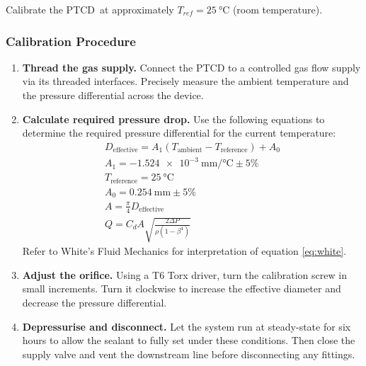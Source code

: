 \documentclass[12pt, letterpaper]{report}%
\newcounter{mycounter}           %
\newcounter{sub}[mycounter]      %
\newcommand{\device}{PTCD}
\newcommand{\Tref}{\SI{25}{\degreeCelsius}} %
\newcommand{\AoneExact}{\SI{-1.524e-3}{\milli\meter\per\celsius}}
\newcommand{\Aone}{\AoneExact \pm 5\%}
\newcommand{\AzeroExact}{\SI{0.254}{\milli\meter}}
\newcommand{\Azero}{\AzeroExact \pm 5\%}
\begin{document}
Calibrate the \device\ at approximately $T_{ref} = \Tref$ (room temperature).

\subsubsection*{Calibration Procedure}

\begin{enumerate}[itemsep=5pt]
	\item \textbf{Thread the gas supply.} Connect the PTCD to a controlled gas flow
				supply via its threaded interfaces. Precisely measure the ambient temperature
				and the pressure differential across the device.
	\item \textbf{Calculate required pressure drop.} Use the following equations to determine
				the required pressure differential for the current temperature:
				\begin{align}
					D_{\text{effective}} = A_1 (T_{\text{ambient}} - T_{\text{reference}}) + A_0 \\
					A_1 = \Aone \\
					T_{\text{reference}} = \SI{25}{\degreeCelsius} \\
					A_0 = \Azero \\
					A = \frac{\pi}{4} D_{\text{effective}} \\
					Q = C_d A \sqrt{\frac{2 \Delta P}{\rho (1 - \beta^4)}} \label{eq:white}
				\end{align}
				Refer to White's Fluid Mechanics\cite[eq.~6-102]{ref_white} for interpretation of
				equation \eqref{eq:white}.
	\item \textbf{Adjust the orifice.} Using a T6 Torx driver, turn the calibration
				screw in small increments. Turn it clockwise to increase the effective
				diameter and decrease the pressure differential.
	\item \textbf{Depressurise and disconnect.} Let the system run at steady-state for six hours
				to allow the sealant to fully set under these conditions. Then close the supply valve and vent
				the downstream line before disconnecting any fittings.
\end{enumerate}
\end{document}
